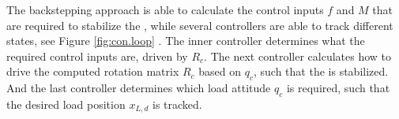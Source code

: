 The backstepping approach is able to calculate the control inputs $ f $ and $ M $ that are required to stabilize the , while several controllers are able to track different states, see Figure \ref{fig:con.loop} \cite{Sreenath2013c}. 
The inner controller determines what the required control inputs are, driven by $ R_c $.  
The next controller calculates how to drive the computed rotation matrix $ R_c $ based on $ q_c $, such that the  is stabilized.
And the last controller determines which load attitude $ q_c $ is required, such that the desired load position $ x_{L,d} $ is tracked.

%
%

